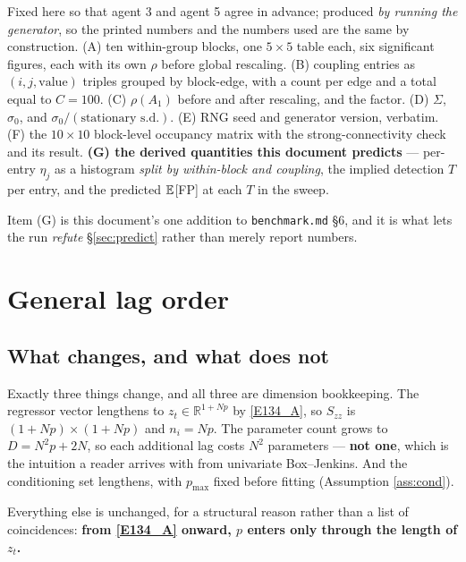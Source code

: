 Fixed here so that agent 3 and agent 5 agree in advance; produced \emph{by running
the generator}, so the printed numbers and the numbers used are the same by
construction. (A) ten within-group blocks, one $5\times5$ table each, six significant
figures, each with its own $\rho$ before global rescaling. (B) coupling entries as
$(i,j,\text{value})$ triples grouped by block-edge, with a count per edge and a total
equal to $C=100$. (C) $\rho(A_1)$ before and after rescaling, and the factor. (D)
$\Sigma$, $\sigma_0$, and $\sigma_0/(\text{stationary s.d.})$. (E) RNG seed and
generator version, verbatim. (F) the $10\times10$ block-level occupancy matrix with
the strong-connectivity check and its result. \textbf{(G) the derived quantities this
document predicts} --- per-entry $\eta_j$ as a histogram \emph{split by within-block
and coupling}, the implied detection $T$ per entry, and the predicted $\mathbb{E}$[FP] at
each $T$ in the sweep.

Item (G) is this document's one addition to \texttt{benchmark.md} \S6, and it is what
lets the run \emph{refute} \S\ref{sec:predict} rather than merely report numbers.



\section{General lag order}\label{sec:lag}

\subsection{What changes, and what does not}

Exactly three things change, and all three are dimension bookkeeping. The regressor
vector lengthens to $z_t\in\mathbb{R}^{1+Np}$ by \eqref{E134_A}, so $S_{zz}$ is
$(1+Np)\times(1+Np)$ and $n_i=Np$. The parameter count grows to $D=N^2p+2N$, so each
additional lag costs $N^2$ parameters --- \textbf{not one}, which is the intuition a
reader arrives with from univariate Box--Jenkins. And the conditioning set lengthens,
with $p_{\max}$ fixed before fitting (Assumption \ref{ass:cond}).

Everything else is unchanged, for a structural reason rather than a list of
coincidences: \textbf{from \eqref{E134_A} onward, $p$ enters only through the length of
$z_t$.}

